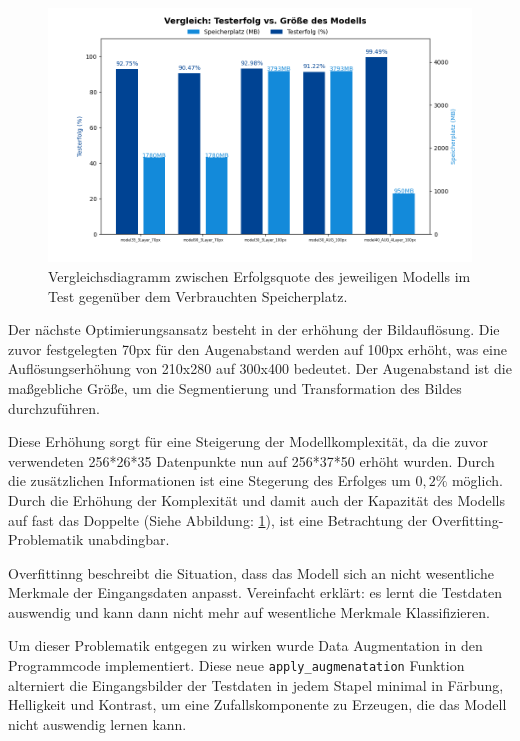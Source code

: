 \documentclass[journal,twoside,web]{ieeecolor}
\begin{document}
\begin{figure}[H]
    \centerline{\includegraphics[width=\columnwidth]{Erfolg_Groesse.png}}
    \caption{Vergleichsdiagramm zwischen Erfolgsquote des jeweiligen Modells im Test gegenüber dem Verbrauchten Speicherplatz.}
    \label{fig:compareSize}
\end{figure}

Der nächste Optimierungsansatz besteht in der erhöhung der Bildauflösung. Die zuvor festgelegten 70px für den Augenabstand werden auf 100px erhöht, was eine Auflösungserhöhung von 210x280 auf 300x400 bedeutet.
Der Augenabstand ist die maßgebliche Größe, um die Segmentierung und Transformation des Bildes durchzuführen.

Diese Erhöhung sorgt für eine Steigerung der Modellkomplexität, da die zuvor verwendeten 256*26*35 Datenpunkte nun auf 256*37*50 erhöht wurden. 
Durch die zusätzlichen Informationen ist eine Stegerung des Erfolges um $0,2\%$ möglich. Durch die Erhöhung der Komplexität und damit auch der Kapazität des Modells auf fast das Doppelte (Siehe Abbildung: \ref{fig:compareSize}), ist eine Betrachtung der Overfitting-Problematik unabdingbar.

Overfittinng beschreibt die Situation, dass das Modell sich an nicht wesentliche Merkmale der Eingangsdaten anpasst. Vereinfacht erklärt: es lernt die Testdaten auswendig und kann dann nicht mehr auf wesentliche Merkmale Klassifizieren.

Um dieser Problematik entgegen zu wirken wurde Data Augmentation in den Programmcode implementiert. 
Diese neue \texttt{apply\_augmenatation} Funktion alterniert die Eingangsbilder der Testdaten in jedem Stapel minimal in Färbung, Helligkeit und Kontrast, um eine Zufallskomponente zu Erzeugen, die das Modell nicht auswendig lernen kann. 
\end{document}
